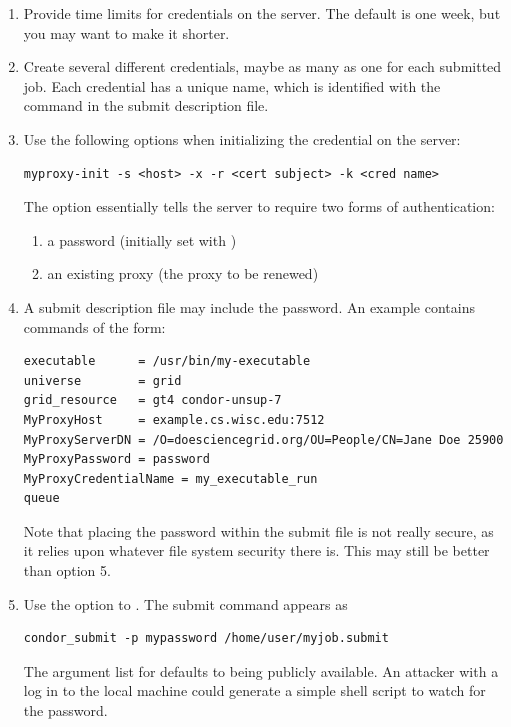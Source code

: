 \begin{enumerate}

\item{Provide time limits}
for credentials on the  server.
The default is one week, but you may want to make it shorter.

\item{Create several different  credentials},
maybe as many as one for each submitted job.
Each credential has a unique name,
which is identified with the
 command in the submit description file.

\item{Use the following options}
when initializing the credential on the  server:

\footnotesize
\begin{verbatim}
myproxy-init -s <host> -x -r <cert subject> -k <cred name>
\end{verbatim}
\normalsize

The option 
essentially tells the  server to require two forms
of authentication:
  \begin{enumerate}
  \item{a password (initially set with )}
  \item{an existing proxy (the proxy to be renewed)}
  \end{enumerate}

\item{A submit description file may include the password.}
An example contains commands of the form:
\footnotesize
\begin{verbatim}
executable      = /usr/bin/my-executable
universe        = grid
grid_resource   = gt4 condor-unsup-7
MyProxyHost     = example.cs.wisc.edu:7512
MyProxyServerDN = /O=doesciencegrid.org/OU=People/CN=Jane Doe 25900
MyProxyPassword = password
MyProxyCredentialName = my_executable_run
queue
\end{verbatim}
\normalsize
Note that placing the password within the submit file
is not really secure,
as it relies upon whatever file system security there is.
This may still be better than option 5.

\item{Use the  option to .}
The submit command appears as
\footnotesize
\begin{verbatim}
condor_submit -p mypassword /home/user/myjob.submit
\end{verbatim}
\normalsize
The argument list for  defaults to
being publicly available.
An attacker with a log in to the local machine could
generate a simple shell script
to watch for the password. 

\end{enumerate}

